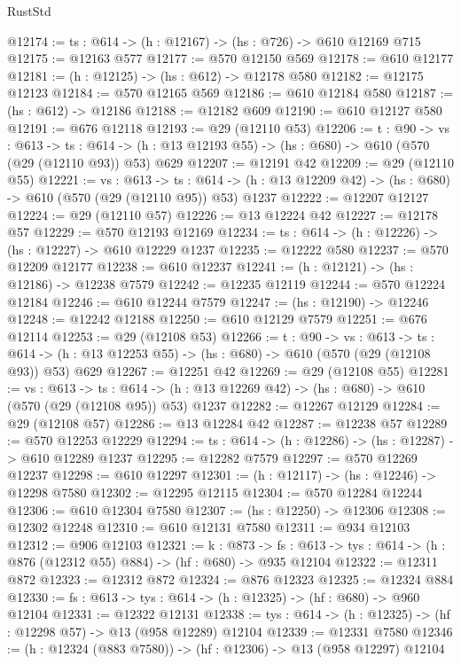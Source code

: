 \begin{lexlean}{RustStd}
\begin{coremodule}
@12174 := {ts : @614} -> (h : @12167) -> (hs : @726) -> @610 @12169 @715
@12175 := @12163 @577
@12177 := @570 @12150 @569
@12178 := @610 @12177
@12181 := (h : @12125) -> (hs : @612) -> @12178 @580
@12182 := @12175 @12123
@12184 := @570 @12165 @569
@12186 := @610 @12184 @580
@12187 := (hs : @612) -> @12186
@12188 := @12182 @609
@12190 := @610 @12127 @580
@12191 := @676 @12118
@12193 := @29 (@12110 @53)
@12206 := {t : @90} ->
  {vs : @613} ->
  {ts : @614} -> (h : @13 @12193 @55) -> (hs : @680) -> @610 (@570 (@29 (@12110 @93)) @53) @629
@12207 := @12191 @42
@12209 := @29 (@12110 @55)
@12221 := {vs : @613} ->
  {ts : @614} -> (h : @13 @12209 @42) -> (hs : @680) -> @610 (@570 (@29 (@12110 @95)) @53) @1237
@12222 := @12207 @12127
@12224 := @29 (@12110 @57)
@12226 := @13 @12224 @42
@12227 := @12178 @57
@12229 := @570 @12193 @12169
@12234 := {ts : @614} -> (h : @12226) -> (hs : @12227) -> @610 @12229 @1237
@12235 := @12222 @580
@12237 := @570 @12209 @12177
@12238 := @610 @12237
@12241 := (h : @12121) -> (hs : @12186) -> @12238 @7579
@12242 := @12235 @12119
@12244 := @570 @12224 @12184
@12246 := @610 @12244 @7579
@12247 := (hs : @12190) -> @12246
@12248 := @12242 @12188
@12250 := @610 @12129 @7579
@12251 := @676 @12114
@12253 := @29 (@12108 @53)
@12266 := {t : @90} ->
  {vs : @613} ->
  {ts : @614} -> (h : @13 @12253 @55) -> (hs : @680) -> @610 (@570 (@29 (@12108 @93)) @53) @629
@12267 := @12251 @42
@12269 := @29 (@12108 @55)
@12281 := {vs : @613} ->
  {ts : @614} -> (h : @13 @12269 @42) -> (hs : @680) -> @610 (@570 (@29 (@12108 @95)) @53) @1237
@12282 := @12267 @12129
@12284 := @29 (@12108 @57)
@12286 := @13 @12284 @42
@12287 := @12238 @57
@12289 := @570 @12253 @12229
@12294 := {ts : @614} -> (h : @12286) -> (hs : @12287) -> @610 @12289 @1237
@12295 := @12282 @7579
@12297 := @570 @12269 @12237
@12298 := @610 @12297
@12301 := (h : @12117) -> (hs : @12246) -> @12298 @7580
@12302 := @12295 @12115
@12304 := @570 @12284 @12244
@12306 := @610 @12304 @7580
@12307 := (hs : @12250) -> @12306
@12308 := @12302 @12248
@12310 := @610 @12131 @7580
@12311 := @934 @12103
@12312 := @906 @12103
@12321 := {k : @873} ->
  {fs : @613} -> {tys : @614} -> (h : @876 (@12312 @55) @884) -> (hf : @680) -> @935 @12104
@12322 := @12311 @872
@12323 := @12312 @872
@12324 := @876 @12323
@12325 := @12324 @884
@12330 := {fs : @613} -> {tys : @614} -> (h : @12325) -> (hf : @680) -> @960 @12104
@12331 := @12322 @12131
@12338 := {tys : @614} -> (h : @12325) -> (hf : @12298 @57) -> @13 (@958 @12289) @12104
@12339 := @12331 @7580
@12346 := (h : @12324 (@883 @7580)) -> (hf : @12306) -> @13 (@958 @12297) @12104

\end{coremodule}
\end{lexlean}
